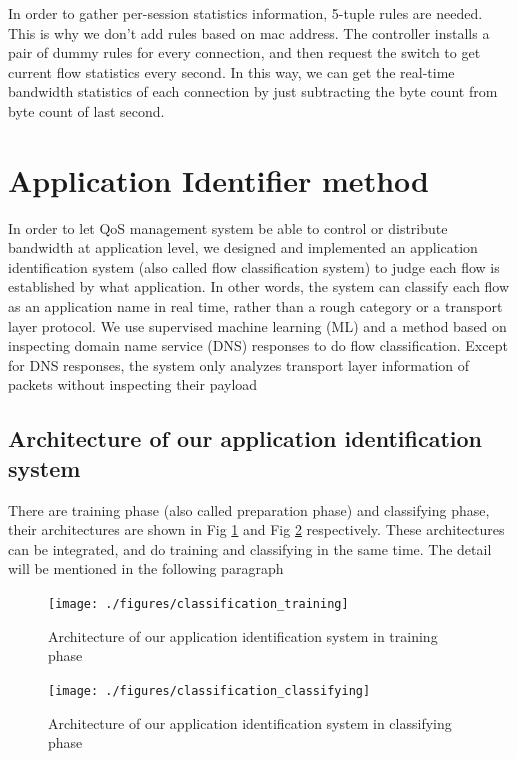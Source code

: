 \documentclass[journal]{IEEEtran}
\begin{document}
In order to gather per-session statistics information, 5-tuple rules are needed. This is why we don’t add rules  based on mac address.  The controller installs a pair of dummy rules for every connection, and then request the switch to get current flow statistics every second. In this way, we can get the real-time bandwidth statistics of each connection by just subtracting the byte count from byte count of last second.



\section{Application Identifier method} \label{sec:app_classification}
In order to let QoS management system be able to control or distribute bandwidth at application level, we designed and implemented an application identification system (also called flow classification system) to judge each flow is established by what application. In other words, the system can classify each flow as an application name in real time, rather than a rough category or a transport layer protocol.
We use supervised machine learning (ML) and a method based on inspecting domain name service (DNS) responses to do flow classification. Except for DNS responses, the system only analyzes transport layer information of packets without inspecting their payload


\subsection{Architecture of our application identification system}
There are training phase (also called preparation phase) and classifying phase, their architectures are shown in Fig \ref{fig:classifcation_training} and Fig \ref{fig:classifcation_classifying} respectively. These architectures can be integrated, and do training and classifying in the same time. The detail will be mentioned in the following paragraph

\begin{figure}[!t]
\centering
\texttt{[image: ./figures/classification\_training]}
\caption{Architecture of our application identification system in training phase}
\label{fig:classifcation_training}
\end{figure}

\begin{figure}[!t]
\centering
\texttt{[image: ./figures/classification\_classifying]}
\caption{Architecture of our application identification system in classifying phase}
\label{fig:classifcation_classifying}
\end{figure}
\end{document}
